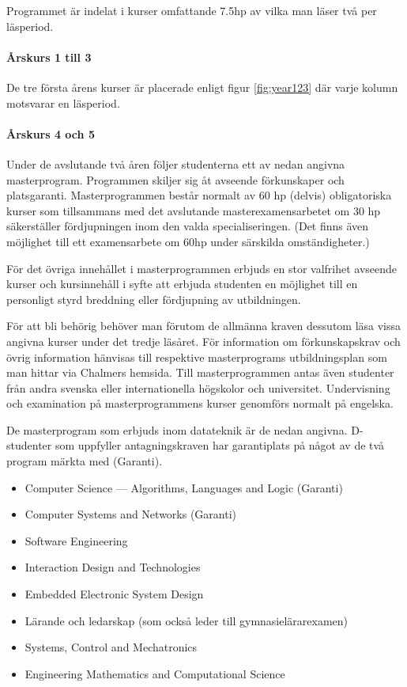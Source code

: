 \documentclass[twocolumn]{article}
\begin{document}

Programmet är indelat i kurser omfattande 7.5hp av vilka man läser
två per läsperiod.
\paragraph{Årskurs 1 till 3} De tre första årens kurser är placerade
enligt figur \ref{fig:year123} där varje kolumn motsvarar en läsperiod.

\paragraph{Årskurs 4 och 5}

Under de avslutande två åren följer studenterna ett av nedan angivna
masterprogram.  Programmen skiljer sig åt avseende förkunskaper och
platsgaranti.  Masterprogrammen består normalt av 60 hp (delvis)
obligatoriska kurser som tillsammans med det avslutande
masterexamensarbetet om 30 hp säkerställer fördjupningen inom den
valda specialiseringen. (Det finns även möjlighet till ett
examensarbete om 60hp under särskilda omständigheter.)

För det övriga innehållet i masterprogrammen erbjuds en stor valfrihet
avseende kurser och kursinnehåll i syfte att erbjuda studenten en
möjlighet till en personligt styrd breddning eller fördjupning av
utbildningen.

För att bli behörig behöver man förutom de allmänna kraven dessutom
läsa vissa angivna kurser under det tredje läsåret. För information om
förkunskapskrav och övrig information hänvisas till respektive
masterprograms utbildningsplan som man hittar via Chalmers
hemsida. Till masterprogrammen antas även studenter från andra svenska
eller internationella högskolor och universitet.  Undervisning och
examination på masterprogrammens kurser genomförs normalt på engelska.

De masterprogram som erbjuds inom datateknik är de nedan
angivna. D-studenter som uppfyller antagningskraven har garantiplats
på något av de två program märkta med (Garanti).

\begin{itemize}
\item \foreignlanguage{british}{Computer Science --- Algorithms,
    Languages and Logic} (Garanti)
\item \foreignlanguage{british}{Computer Systems and Networks} (Garanti)
\item \foreignlanguage{british}{Software Engineering}
\item \foreignlanguage{british}{Interaction Design and Technologies}
\item \foreignlanguage{british}{Embedded Electronic System Design}
\item Lärande och ledarskap (som också leder till gymnasielärarexamen)
\item \foreignlanguage{british}{Systems, Control and Mechatronics}
\item \foreignlanguage{british}{Engineering Mathematics and Computational Science}
\end{itemize}
\end{document}
